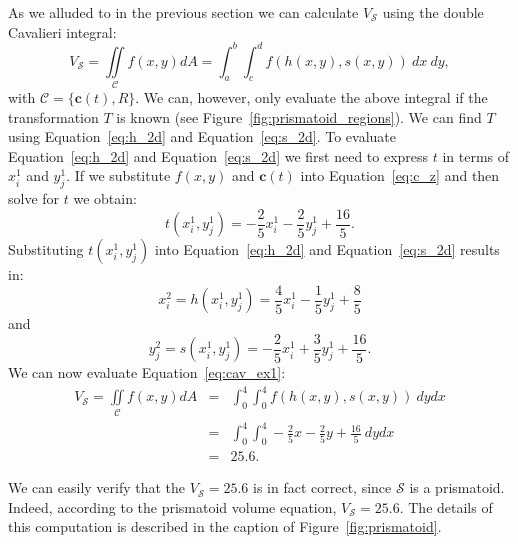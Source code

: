 \documentclass{article}
\theoremstyle{theorem}
\theoremstyle{definition}
\begin{document}
\noindent
As we alluded to in the previous section we can calculate $V_{\mathcal{S}}$ using the double Cavalieri integral:
\begin{equation}
\label{eq:cav_ex1}
V_{\mathcal{S}} = \iint\limits_{\!\mathcal{C}} f(x,y) dA =  \int_a^b\int_c^d f(h(x,y),s(x,y))~dx~dy,
\end{equation}
with $\mathcal{C}=\{\mathbf{c}(t),R\}$. We can, however, only evaluate the above integral if the transformation $T$ is known (see Figure~\ref{fig:prismatoid_regions}). We can find $T$ using Equation~\eqref{eq:h_2d} and 
Equation~\eqref{eq:s_2d}. To evaluate Equation~\eqref{eq:h_2d} and Equation~\eqref{eq:s_2d} we first need to express $t$ in terms of $x_i^1$ and $y_j^1$. If we substitute $f(x,y)$ and $\mathbf{c}(t)$ into Equation~\eqref{eq:c_z} and then solve for $t$ we obtain:
\begin{equation}
t(x_i^1,y_j^1) = -\frac{2}{5}x_i^1 - \frac{2}{5}y_j^1 + \frac{16}{5}. \nonumber
\end{equation}
Substituting $t(x_i^1,y_j^1)$ into Equation~\eqref{eq:h_2d} and Equation~\eqref{eq:s_2d} results in:
\begin{equation}
x_{i}^2 = h(x_{i}^1,y_{j}^1) = \frac{4}{5} x_{i}^1 - \frac{1}{5} y_{j}^1 + \frac{8}{5}  \nonumber
\end{equation}
and
\begin{equation}
y_{j}^2 = s(x_{i}^1,y_{j}^1) = -\frac{2}{5} x_{i}^1 + \frac{3}{5} y_{j}^1 + \frac{16}{5}.  \nonumber
\end{equation}
We can now evaluate Equation~\eqref{eq:cav_ex1}:
\begin{eqnarray}
\label{eq:final_int_prismatoid}
V_{\mathcal{S}}=\iint\limits_{\!\mathcal{C}} f(x,y) dA &=& \int_0^4\int_0^4 f(h(x,y),s(x,y))~dydx\nonumber\\
&=& \int_0^4 \int_0^4 -\frac{2}{5}x - \frac{2}{5} y + \frac{16}{5}~dydx\nonumber\\
&=& 25.6.\nonumber
\end{eqnarray}

\noindent
We can easily verify that the $V_{\mathcal{S}} = 25.6$ is in fact correct, since $\mathcal{S}$ is a prismatoid. Indeed, according to the prismatoid volume 
equation,  $V_{\mathcal{S}}=25.6$. The details of this computation is described in the caption of Figure~\ref{fig:prismatoid}.
\end{document}
